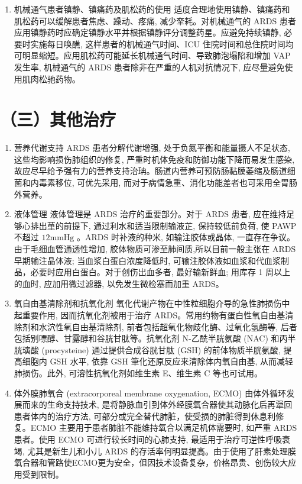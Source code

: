 \documentclass[10pt]{article}
\begin{document}
\begin{enumerate}
  \item 机械通气患者镇静、镇痛药及肌松药的使用 适度合理地使用镇静、镇痛药和肌松药可以缓解患者焦虑、躁动、疼痛, 减少羍耗。对机械通气的 ARDS 患者应用镇静药时应确定镇静水平并根据镇静评分调整药星。应避免持续镇静, 必要时实施每日唤醮, 这样患者的机械通气时间、ICU 住院时间和总住院时间均可明显缩短。应用肌松药可能延长机械通气时间、导致肺泡塌陷和增加 VAP 发生率, 机械通气的 ARDS 患者除非在严重的人机对抗情况下, 应尽量避免使用肌肉松驰药物。

\end{enumerate}

\section*{（三）其他治疗}
\begin{enumerate}
  \item 营养代谢支持 ARDS 患者分解代谢增强, 处于负氮平衡和能量摄人不足状态, 这些均影响损伤肺组织的修复, 严重时机体免疫和防御功能下降而易发生感染, 故应尽早给予强有力的营养支持治珃。肠道内营养可预防肠黏膜萎缩及肠道细菌和内毒素移位, 可优先采用, 而对于病情急重、消化功能差者也可采用全胃肠外营养。

  \item 液体管理 液体管理是 ARDS 治疗的重要部分。对于 ARDS 患者, 应在维持足够心排出荲的前提下, 通过利水和适当限制输液芷, 保持较低前负荷, 使 PAWP 不超过 $12 \mathrm{mmHg}$ 。ARDS 时补液的种米, 如输注胶体或晶体, 一直存在争议。由于毛细血管通透性增加, 胶体物质可渗至肺间质,所以目前一般主张在 ARDS 早期输注晶体液; 当血浆白蛋白浓度降低时, 可输注胶体液如血浆和代血浆制品，必要时应用白蛋白。对于创伤出血多者, 最好输新鲜血; 用库存 1 周以上的血时, 应加用微过滤器, 以免发生微检塞而加重 ARDS。

  \item 氧自由基清除剂和抗氧化剂 氧化代谢产物在中性粒细胞介导的急性肺损伤中起重要作用, 因而抗氧化剂被用于治疗 ARDS。常用约物有蛋白性氧自由基清除剂和水泬性氧自由基清除剂, 前者包括超氧化物歧化酶、过氧化氢酶等, 后者包括别嘌醇、甘露醇和谷胱甘肽等。抗氧化剂 $\mathrm{N}$-乙酰半胱氨酸 (NAC) 和丙半胱璌酸 (procysteine) 通过提供合成谷胱甘肽 (GSH) 的前体物质半胱氨酸, 提高细胞内 GSH 水平, 依靠 GSH 筆化还原反应来清除体内氧自由基, 从而减轻肺损伤。此外, 可溶性抗氧化剂如维生素 E、维生素 C 等也可试用。

  \item 体外膜肺氧合 (extracorporeal membrane oxygenation, ECMO) 由体外循环发展而来的生命支持技术, 是将静脉血引到体外经膜氧合器使其动脉化后再犟回患者体内的治疗方法, 可部分或完全替代肺脏，使受损的肺脏得到休息利修复。ECMO 主要用于患者肺脏不能维持氧合以满足机体需要时, 如严重 ARDS 患者。使用 ECMO 可进行较长时间的心肺支持, 最适用于治疗可逆性呼吸衰竭, 尤其是新生儿和小儿 ARDS 的存活率何明显提高。由于使用了肝素处理膜氧合器和管路使ECMO更为安全，伹因技术设备复杂，价格昂贵、创伤较大应用受到限制。


\end{enumerate}
\end{document}
